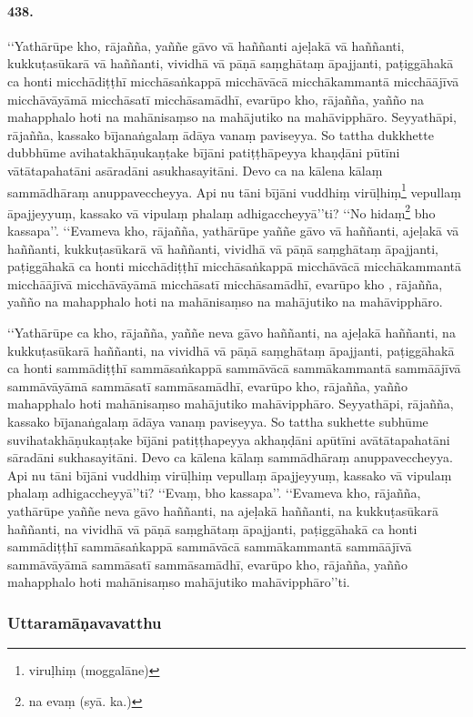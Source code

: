 \paragraph{438.} ‘‘Yathārūpe kho, rājañña, yaññe gāvo vā haññanti ajeḷakā vā haññanti, kukkuṭasūkarā vā haññanti, vividhā vā pāṇā saṃghātaṃ āpajjanti, paṭiggāhakā ca honti micchādiṭṭhī micchāsaṅkappā micchāvācā micchākammantā micchāājīvā micchāvāyāmā micchāsatī micchāsamādhī, evarūpo kho, rājañña, yañño na mahapphalo hoti na mahānisaṃso na mahājutiko na mahāvipphāro. Seyyathāpi, rājañña, kassako bījanaṅgalaṃ ādāya vanaṃ paviseyya. So tattha dukkhette dubbhūme avihatakhāṇukaṇṭake bījāni patiṭṭhāpeyya khaṇḍāni pūtīni vātātapahatāni asāradāni asukhasayitāni. Devo ca na kālena kālaṃ sammādhāraṃ anuppaveccheyya. Api nu tāni bījāni vuddhiṃ virūḷhiṃ\footnote{viruḷhiṃ (moggalāne)} vepullaṃ āpajjeyyuṃ, kassako vā vipulaṃ phalaṃ adhigaccheyyā’’ti? ‘‘No hidaṃ\footnote{na evaṃ (syā. ka.)} bho kassapa’’. ‘‘Evameva kho, rājañña, yathārūpe yaññe gāvo vā haññanti, ajeḷakā vā haññanti, kukkuṭasūkarā vā haññanti, vividhā vā pāṇā saṃghātaṃ āpajjanti, paṭiggāhakā ca honti micchādiṭṭhī micchāsaṅkappā micchāvācā micchākammantā micchāājīvā micchāvāyāmā micchāsatī micchāsamādhī, evarūpo kho , rājañña, yañño na mahapphalo hoti na mahānisaṃso na mahājutiko na mahāvipphāro.

‘‘Yathārūpe ca kho, rājañña, yaññe neva gāvo haññanti, na ajeḷakā haññanti, na kukkuṭasūkarā haññanti, na vividhā vā pāṇā saṃghātaṃ āpajjanti, paṭiggāhakā ca honti sammādiṭṭhī sammāsaṅkappā sammāvācā sammākammantā sammāājīvā sammāvāyāmā sammāsatī sammāsamādhī, evarūpo kho, rājañña, yañño mahapphalo hoti mahānisaṃso mahājutiko mahāvipphāro. Seyyathāpi, rājañña, kassako bījanaṅgalaṃ ādāya vanaṃ paviseyya. So tattha sukhette subhūme suvihatakhāṇukaṇṭake bījāni patiṭṭhapeyya akhaṇḍāni apūtīni avātātapahatāni sāradāni sukhasayitāni. Devo ca kālena kālaṃ sammādhāraṃ anuppaveccheyya. Api nu tāni bījāni vuddhiṃ virūḷhiṃ vepullaṃ āpajjeyyuṃ, kassako vā vipulaṃ phalaṃ adhigaccheyyā’’ti? ‘‘Evaṃ, bho kassapa’’. ‘‘Evameva kho, rājañña, yathārūpe yaññe neva gāvo haññanti, na ajeḷakā haññanti, na kukkuṭasūkarā haññanti, na vividhā vā pāṇā saṃghātaṃ āpajjanti, paṭiggāhakā ca honti sammādiṭṭhī sammāsaṅkappā sammāvācā sammākammantā sammāājīvā sammāvāyāmā sammāsatī sammāsamādhī, evarūpo kho, rājañña, yañño mahapphalo hoti mahānisaṃso mahājutiko mahāvipphāro’’ti.

\subsubsection{Uttaramāṇavavatthu}

